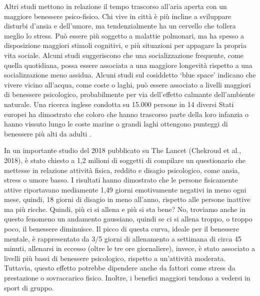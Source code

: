\documentclass[12pt]{book} %
\begin{document}
\begin{mdframed}[linewidth=1pt]
Altri studi mettono in relazione il tempo trascorso all'aria aperta con un maggiore benessere psico-fisico. Chi vive in
città è più incline a sviluppare disturbi d'ansia e dell'umore, ma tendenzialmente ha un cervello che tollera meglio lo stress. Può
essere più soggetto a malattie polmonari, ma ha spesso a disposizione maggiori stimoli cognitivi, e più situazioni per
appagare la propria vita sociale. Alcuni studi suggeriscono che una socializzazione frequente, come quella quotidiana, possa essere associata a una maggiore longevità rispetto a una socializzazione meno assidua.
Alcuni studi sul cosiddetto ‘blue space’ indicano che vivere vicino all’acqua, come coste o laghi, può essere associato a livelli maggiori di benessere psicologico, probabilmente per via dell’effetto calmante dell’ambiente naturale. Una ricerca inglese condotta su 15.000 persone in 14 diversi Stati europei ha dimostrato che coloro che hanno trascorso parte della loro infanzia o hanno vissuto lungo le coste marine o grandi laghi ottengono punteggi di benessere più alti da adulti .

In un importante studio del 2018 pubblicato su The Lancet (Chekroud et al.,
2018), è stato chiesto a 1,2 milioni
di soggetti di compilare un questionario che mettesse in relazione attività fisica, reddito e disagio psicologico, come
ansia, stress o umore basso. I risultati hanno dimostrato che le persone fisicamente attive riportavano mediamente 1,49
giorni emotivamente negativi in meno ogni mese, quindi, 18 giorni di disagio in meno all'anno,
rispetto alle persone inattive ma più ricche. Quindi, più ci si allena e più si sta bene? No, troviamo anche in questo
fenomeno un andamento gaussiano, quindi se ci si allena troppo, o troppo poco, il benessere diminuisce. Il picco di
questa curva, ideale per il benessere mentale, è rappresentato da 3/5 giorni di allenamento a settimana di circa 45
minuti, allenarsi in eccesso (oltre le tre ore giornaliere), invece, è stato associato a livelli più bassi di benessere psicologico, rispetto a un’attività moderata. Tuttavia, questo effetto potrebbe dipendere anche da fattori come stress da prestazione o sovraccarico fisico. 
Inoltre, i benefici maggiori tendono a vedersi in sport di gruppo.


\end{mdframed}
\end{document}
